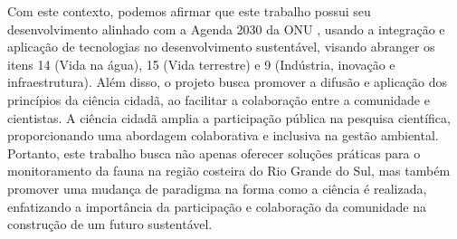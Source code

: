 Com este contexto, podemos afirmar que este trabalho possui seu desenvolvimento alinhado com a Agenda 2030 da ONU \cite{onu2015agenda2030}, usando a integração e aplicação de tecnologias no desenvolvimento sustentável, visando abranger os itens 14 (Vida na água), 15 (Vida terrestre) e 9 (Indústria, inovação e infraestrutura). Além disso, o projeto busca promover a difusão e aplicação dos princípios da ciência cidadã, ao facilitar a colaboração entre a comunidade e cientistas. A ciência cidadã amplia a participação pública na pesquisa científica, proporcionando uma abordagem colaborativa e inclusiva na gestão ambiental. Portanto, este trabalho busca não apenas oferecer soluções práticas para o monitoramento da fauna na região costeira do Rio Grande do Sul, mas também promover uma mudança de paradigma na forma como a ciência é realizada, enfatizando a importância da participação e colaboração da comunidade na construção de um futuro sustentável. 

